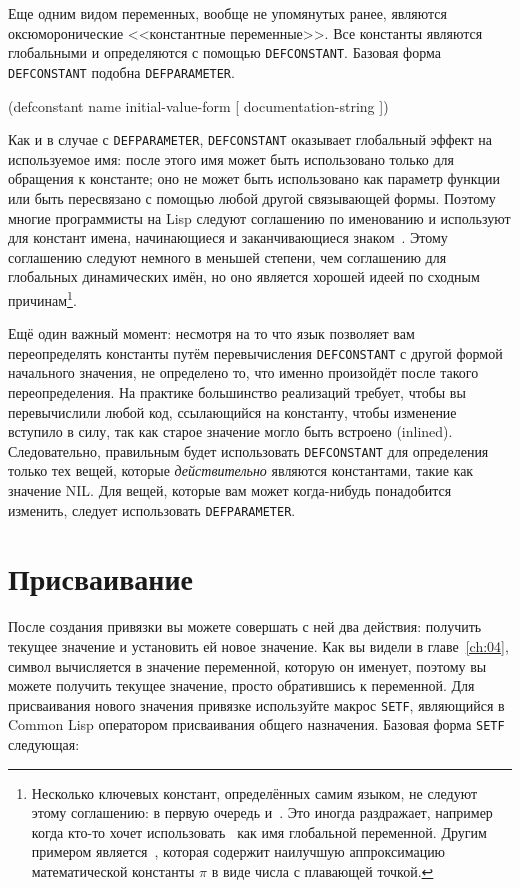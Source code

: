 Еще одним видом переменных, вообще не упомянутых ранее, являются оксюморонические
<<константные переменные>>. Все константы являются глобальными и определяются с помощью
\lstinline{DEFCONSTANT}. Базовая форма \lstinline{DEFCONSTANT} подобна \lstinline{DEFPARAMETER}.

\begin{myverb}
  (defconstant name initial-value-form [ documentation-string ])
\end{myverb}

Как и в случае с \lstinline{DEFPARAMETER}, \lstinline{DEFCONSTANT} оказывает глобальный
эффект на используемое имя: после этого имя может быть использовано только для обращения к
константе; оно не может быть использовано как параметр функции или быть пересвязано с
помощью любой другой связывающей формы. Поэтому многие программисты на Lisp следуют
соглашению по именованию и используют для констант имена, начинающиеся и заканчивающиеся
знаком~\code{+}. Этому соглашению следуют немного в меньшей степени, чем соглашению для
глобальных динамических имён, но оно является хорошей идеей по сходным
причинам\footnote{Несколько ключевых констант, определённых самим языком, не следуют этому
  соглашению: в первую очередь  и~. Это иногда раздражает, например
  когда кто-то хочет использовать~ как имя глобальной переменной. Другим примером
  является~, которая содержит наилучшую аппроксимацию математической константы
  $\pi$ в виде числа с плавающей точкой.}.

Ещё один важный момент: несмотря на то что язык позволяет вам переопределять константы
путём перевычисления \lstinline{DEFCONSTANT} с другой формой начального значения, не
определено то, что именно произойдёт после такого переопределения. На практике
большинство реализаций требует, чтобы вы перевычислили любой код, ссылающийся на
константу, чтобы изменение вступило в силу, так как старое значение могло быть встроено
(inlined). Следовательно, правильным будет использовать \lstinline{DEFCONSTANT} для
определения только тех вещей, которые \textit{действительно} являются константами, такие
как значение NIL. Для вещей, которые вам может когда-нибудь понадобится изменить, следует
использовать \lstinline{DEFPARAMETER}.

\section{Присваивание}

После создания привязки вы можете совершать с ней два действия: получить текущее значение
и установить ей новое значение. Как вы видели в главе~\ref{ch:04}, символ вычисляется в
значение переменной, которую он именует, поэтому вы можете получить текущее значение,
просто обратившись к переменной. Для присваивания нового значения привязке используйте
макрос \lstinline{SETF}, являющийся в Common Lisp оператором присваивания общего назначения.
Базовая форма \lstinline{SETF} следующая:

